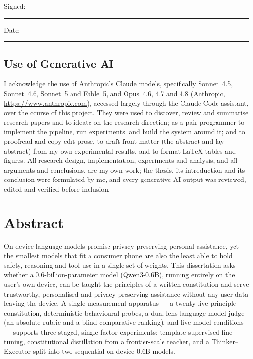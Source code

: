 \documentclass[a4paper,oneside,12pt]{book}
\numberwithin{equation}{chapter} %
\numberwithin{algorithm}{chapter} %
\begin{document}
Signed:~\rule{5cm}{0.3pt}\hfill Date:~\rule{5cm}{0.3pt}

\section*{\Huge\textcolor{tcd_blue}{Use of Generative AI}}
\vspace{0.5cm}
I acknowledge the use of Anthropic's Claude models, specifically Sonnet~4.5, Sonnet~4.6, Sonnet~5 and Fable~5, and Opus~4.6, 4.7 and 4.8 (Anthropic, \url{https://www.anthropic.com}), accessed largely through the Claude Code assistant, over the course of this project. They were used to discover, review and summarise research papers and to ideate on the research direction; as a pair programmer to implement the pipeline, run experiments, and build the system around it; and to proofread and copy-edit prose, to draft front-matter (the abstract and lay abstract) from my own experimental results, and to format \LaTeX{} tables and figures. All research design, implementation, experiments and analysis, and all arguments and conclusions, are my own work; the thesis, its introduction and its conclusion were formulated by me, and every generative-AI output was reviewed, edited and verified before inclusion.

\chapter*{Abstract}
On-device language models promise privacy-preserving personal assistance, yet the smallest models that fit a consumer phone are also the least able to hold safety, reasoning and tool use in a single set of weights. This dissertation asks whether a 0.6-billion-parameter model (Qwen3-0.6B), running entirely on the user's own device, can be taught the principles of a written constitution and serve trustworthy, personalised and privacy-preserving assistance without any user data leaving the device. A single measurement apparatus --- a twenty-five-principle constitution, deterministic behavioural probes, a dual-lens language-model judge (an absolute rubric and a blind comparative ranking), and five model conditions --- supports three staged, single-factor experiments: template supervised fine-tuning, constitutional distillation from a frontier-scale teacher, and a Thinker--Executor split into two sequential on-device 0.6B models.
\end{document}
